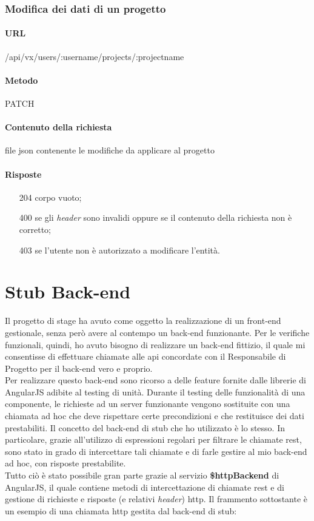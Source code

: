 \subsubsection{Modifica dei dati di un progetto}
\paragraph{URL}
/api/vx/users/:username/projects/:projectname
\paragraph{Metodo}
PATCH
\paragraph{Contenuto della richiesta}
file \gls{json} contenente le modifiche da applicare al progetto
\paragraph{Risposte}
\begin{itemize}
	\item[204] corpo vuoto;
	\item[400] se gli \emph{header} sono invalidi oppure se il contenuto della richiesta non è corretto;
	\item[403] se l'utente non è autorizzato a modificare l'entità.
\end{itemize}



\section{Stub Back-end}
Il progetto di stage ha avuto come oggetto la realizzazione di un \gls{front-end} gestionale, senza però avere al contempo un \gls{back-end} funzionante. Per le verifiche funzionali, quindi, ho avuto bisogno di realizzare un \gls{back-end} fittizio, il quale mi consentisse di effettuare chiamate alle \gls{api} concordate con il Responsabile di Progetto per il \gls{back-end} vero e proprio.\\
Per realizzare questo \gls{back-end} sono ricorso a delle feature fornite dalle librerie di AngularJS adibite al testing di unità. Durante il testing delle funzionalità di una componente, le richieste ad un server funzionante vengono sostituite con una chiamata ad hoc che deve rispettare certe precondizioni e che restituisce dei dati prestabiliti. Il concetto del \gls{back-end} di \gls{stub} che ho utilizzato è lo stesso. In particolare, grazie all'utilizzo di espressioni regolari per filtrare le chiamate \gls{rest}, sono stato in grado di intercettare tali chiamate e di farle gestire al mio \gls{back-end} ad hoc, con risposte prestabilite.\\
Tutto ciò è stato possibile gran parte grazie al servizio \textbf{\$httpBackend} di AngularJS, il quale contiene metodi di intercettazione di chiamate \gls{rest} e di gestione di richieste e risposte (e relativi \emph{header}) \gls{http}. Il frammento sottostante è un esempio di una chiamata \gls{http} gestita dal \gls{back-end} di \gls{stub}:

